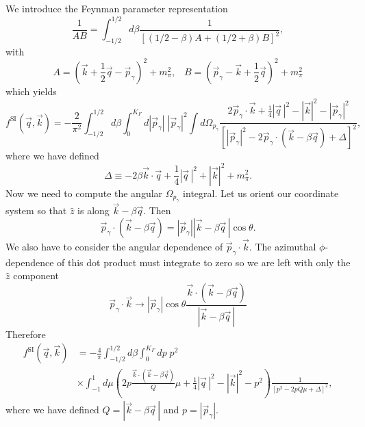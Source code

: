 \documentclass[12pt,letterpaper]{book}
\begin{document}
We introduce the Feynman parameter representation
\begin{equation}
\frac{1}{AB}=\int_{-1/2}^{1/2}d\beta \frac{1}{\left[(1/2-\beta)A+(1/2+\beta)B\right]^2},
\end{equation}
with 
\begin{equation}
A=\left(\vec{k}+\frac{1}{2}\vec{q}-\vec{p}_{\gamma}\right)^2+m_{\pi}^2,\;\;\;B=\left(\vec{p}_{\gamma}-\vec{k}+\frac{1}{2}\vec{q}\right)^2+m_{\pi}^2
\end{equation}
which yields
\begin{equation}
f^\mathrm{SI}(\vec{q},\vec{k})=-\frac{2}{\pi^2}\int_{-1/2}^{1/2}d\beta \int_0^{K_F}d|\vec{p}_{\gamma}|\;|\vec{p}_{\gamma}|^2\int d\Omega_{p_{\gamma}}\frac{2\vec{p}_{\gamma}\cdot\vec{k}+\frac{1}{4}|\vec{q}\,|^2-|\vec{k}|^2-|\vec{p}_{\gamma}|^2}{\left[|\vec{p}_{\gamma}|^2-2\vec{p}_{\gamma}\cdot\left(\vec{k}-\beta\vec{q}\right)+\Delta\right]^2},
\end{equation}
where we have defined
\begin{equation}
\Delta\equiv -2\beta\vec{k}\cdot\vec{q}+\frac{1}{4}|\vec{q}\,|^2+|\vec{k}|^2+m_{\pi}^2.
\end{equation}
Now we need to compute the angular $\Omega_{p_{\gamma}}$ integral. Let us orient our coordinate system so that $\hat{z}$ is along $\vec{k}-\beta\vec{q}$. Then
\begin{equation}
\vec{p}_{\gamma}\cdot \left(\vec{k}-\beta\vec{q}\right)=|\vec{p}_{\gamma}||\vec{k}-\beta\vec{q}\,|\cos\theta.
\end{equation}
We also have to consider the angular dependence of $\vec{p}_{\gamma}\cdot\vec{k}$. The azimuthal $\phi$-dependence of this dot product must integrate to zero so we are left with only the $\hat{z}$ component
\begin{equation}
\vec{p}_{\gamma}\cdot \vec{k}\rightarrow |\vec{p}_{\gamma}|\cos\theta \frac{\vec{k}\cdot(\vec{k}-\beta\vec{q})}{|\vec{k}-\beta\vec{q}\,|}
\end{equation}
Therefore
\begin{equation}
\begin{split}
f^\mathrm{SI}(\vec{q},\vec{k})&=-\frac{4}{\pi}\int_{-1/2}^{1/2}d\beta \int_0^{K_F}dp\;p^2\\
&\times \int_{-1}^1d\mu \left(2p\frac{\vec{k}\cdot\left(\vec{k}-\beta\vec{q}\right)}{Q}\mu+\frac{1}{4}|\vec{q}\,|^2-|\vec{k}|^2-p^2\right)\frac{1}{\left[p^2-2pQ\mu+\Delta\right]^2},
\end{split}
\end{equation}
where we have defined $Q=|\vec{k}-\beta\vec{q}\,|$ and $p=|\vec{p}_\gamma|$.
\end{document}

